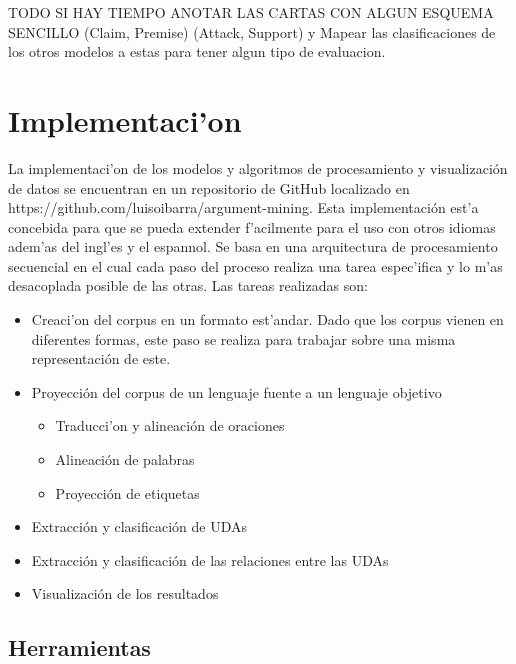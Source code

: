 TODO SI HAY TIEMPO ANOTAR LAS CARTAS CON ALGUN ESQUEMA SENCILLO (Claim, Premise) (Attack, Support) y Mapear 
las clasificaciones de los otros modelos a estas para tener algun tipo de evaluacion.

\section{Implementaci'on}

La implementaci'on de los modelos y algoritmos de procesamiento y visualización de datos se encuentran en 
un repositorio de GitHub localizado en https://github.com/luisoibarra/argument-mining. Esta implementación
est'a concebida para que se pueda extender f'acilmente para el uso con otros idiomas adem'as del ingl'es y el 
espannol. Se basa en una arquitectura de procesamiento secuencial en el cual cada paso del proceso realiza
una tarea espec'ifica y lo m'as desacoplada posible de las otras. Las tareas realizadas son:

\begin{itemize}
    \item Creaci'on del corpus en un formato est'andar. Dado que los corpus vienen en diferentes formas, este paso se realiza para trabajar sobre una misma representación de este.
    \item Proyección del corpus de un lenguaje fuente a un lenguaje objetivo
    \begin{itemize}
        \item Traducci'on y alineación de oraciones
        \item Alineación de palabras
        \item Proyección de etiquetas
    \end{itemize}
    \item Extracción y clasificación de UDAs
    \item Extracción y clasificación de las relaciones entre las UDAs
    \item Visualización de los resultados
\end{itemize}

\subsection{Herramientas}

